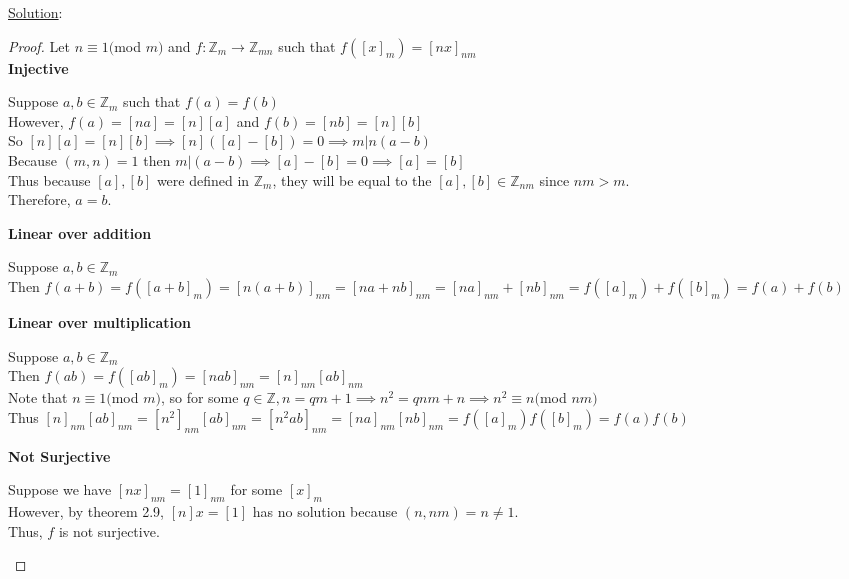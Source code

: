\documentclass{article} %
\begin{document}
\underline{Solution}: 
\begin{addmargin}[1em]{0em}
\begin{proof} \hfill \break
Let $n \equiv 1($mod $m)$ and $f: \mathbb{Z}_m \rightarrow \mathbb{Z}_{mn}$ such that $f([x]_m) = [nx]_{nm}$
\\ \textbf{Injective}
\begin{addmargin}[1em]{0em}
Suppose $a, b \in \mathbb{Z}_m$ such that $f(a) = f(b)$
\\However, $f(a) = [na] = [n][a]$ and $f(b) = [nb] = [n][b]$
\\So $[n][a] = [n][b] \implies [n]([a] - [b]) = 0 \implies m|n(a-b)$
\\Because $(m,n) = 1$ then $m|(a-b) \implies [a] - [b] = 0 \implies [a] = [b]$
\\Thus because $[a], [b]$ were defined in $\mathbb{Z}_m$, they will be equal to the $[a], [b] \in \mathbb{Z}_{nm}$ since $nm > m$.
\\Therefore, $a = b$.
\end{addmargin}
\textbf{Linear over addition}
\begin{addmargin}[1em]{0em}
Suppose $a, b \in \mathbb{Z}_m$
\\Then $f(a + b) = f([a+b]_m) = [n(a+b)]_{nm} = [na + nb]_{nm} = [na]_{nm} + [nb]_{nm} = f([a]_m) + f([b]_m) = f(a) + f(b)$
\end{addmargin}
\textbf{Linear over multiplication}
\begin{addmargin}[1em]{0em}
Suppose $a, b \in \mathbb{Z}_m$\
\\Then $f(ab) = f([ab]_m) = [nab]_{nm} = [n]_{nm}[ab]_{nm}$
\\Note that $n \equiv 1($mod $m)$, so for some $q \in \mathbb{Z}, n = qm + 1 \implies n^2 = qnm + n \implies n^2 \equiv n ($mod $nm)$
\\Thus $[n]_{nm}[ab]_{nm} = [n^2]_{nm}[ab]_{nm} = [n^2ab]_{nm} = [na]_{nm}[nb]_{nm} = f([a]_m)f([b]_m) = f(a)f(b)$
\end{addmargin}
\textbf{Not Surjective}
\begin{addmargin}[1em]{0em}
Suppose we have $[nx]_{nm} = [1]_{nm}$ for some $[x]_m$
\\However, by theorem 2.9, $[n]x = [1]$ has no solution because $(n, nm) = n \neq 1$.
\\Thus, $f$ is not surjective.
\end{addmargin}

\end{proof}
\end{addmargin}
\end{document}
